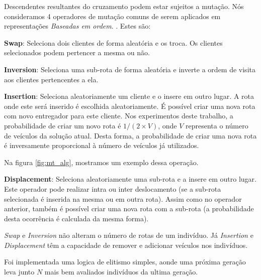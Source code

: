 Descendentes resultantes do cruzamento podem estar sujeitos a mutação. Nós consideramos 4 operadores de mutação comuns de serem aplicados em representações \textit{Baseadas em ordem}. \cite{Rocha}. Estes são:

\textbf{Swap}: Seleciona dois clientes de forma aleatória e os troca. Os clientes selecionados podem pertencer a mesma ou não.

\textbf{Inversion}: Seleciona uma sub-rota de forma aleatória e inverte a ordem de visita aos clientes pertencentes a ela.

\textbf{Insertion}: Seleciona aleatoriamente um cliente e o insere em outro lugar. A rota onde este será inserido é escolhida aleatoriamente. É possível criar uma nova rota com novo entregador para este cliente. Nos experimentos deste trabalho, a probabilidade de criar um novo rota é $1 / (2 \times V)$, onde $V$ representa o número de veículos da solução atual. Desta forma, a probabilidade de criar uma nova rota é inversamente proporcional à número de veículos já utilizados. 

Na figura \ref{fig:mt_alg}, mostramos um exemplo dessa operação.

\textbf{Displacement}: Seleciona aleatoriamente uma sub-rota e a insere em outro lugar. Este operador pode realizar intra ou inter deslocamento (se a sub-rota selecionada é inserida na
mesma ou em outra rota). Assim como no operador anterior, também é possível criar uma nova rota com a sub-rota (a probabilidade desta ocorrência é calculada da mesma forma).

\begin{center}
	\label{fig:mt_alg}
\end{center}


\textit{Swap} e \textit{Inversion} não alteram o número de rotas de um indivíduo. Já \textit{Insertion} e \textit{Displacement} têm a capacidade de remover e adicionar veículos nos indivíduos.

Foi implementada  uma logica de elitismo simples, aonde uma próxima geração leva junto $N$ mais bem avaliados indivíduos da ultima geração.

